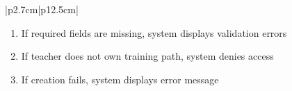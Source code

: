 \begin{table}[H]
\begin{tabular}{|p{2.7cm}|p{12.5cm}|}
\begin{minipage}[t]{\linewidth}
\begin{enumerate}[topsep=0pt,itemsep=1pt,parsep=0pt,partopsep=0pt]
                                          \item If required fields are missing, system displays validation errors
                                          \item If teacher does not own training path, system denies access
                                          \item If creation fails, system displays error message
                                      \end{enumerate}
                                  \end{minipage} \\
        \hline
    \end{tabular}
    \label{tab:teacher-add-unit}
\end{table}
